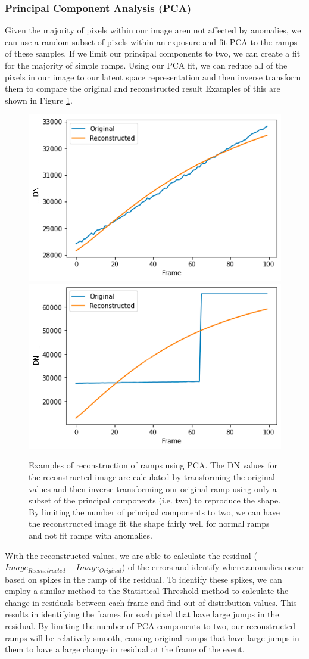 \subsubsection{Principal Component Analysis (PCA)}
Given the majority of pixels within our image aren not affected by anomalies, we can use a random subset of pixels within an exposure and fit PCA to the ramps of these samples.
If we limit our principal components to two, we can create a fit for the majority of simple ramps. 
Using our PCA fit, we can reduce all of the pixels in our image to our latent space representation and then inverse transform them to compare the original and reconstructed result \cite{wold1987principal}
Examples of this are shown in Figure \ref{chap5/fig:PCA}. 
\begin{figure}
    \centering
    \includegraphics[width=0.49\linewidth]{figs/5/PCA_Good.png}
    \includegraphics[width=0.49\linewidth]{figs/5/PCA_Bad.png}
    \caption{Examples of reconstruction of ramps using PCA. The DN values for the reconstructed image are calculated by transforming the original values and then inverse transforming our original ramp using only a subset of the principal components (i.e. two) to reproduce the shape. By limiting the number of principal components to two, we can have the reconstructed image fit the shape fairly well for normal ramps and not fit ramps with anomalies.}
    \label{chap5/fig:PCA}
\end{figure}

With the reconstructed values, we are able to calculate the residual ($Image_{Reconstructed} - Image_{Original}$) of the errors and identify where anomalies occur based on spikes in the ramp of the residual. 
To identify these spikes, we can employ a similar method to the Statistical Threshold method to calculate the change in residuals between each frame and find out of distribution values. 
This results in identifying the frames for each pixel that have large jumps in the residual. 
By limiting the number of PCA components to two, our reconstructed ramps will be relatively smooth, causing original ramps that have large jumps in them to have a large change in residual at the frame of the event.


